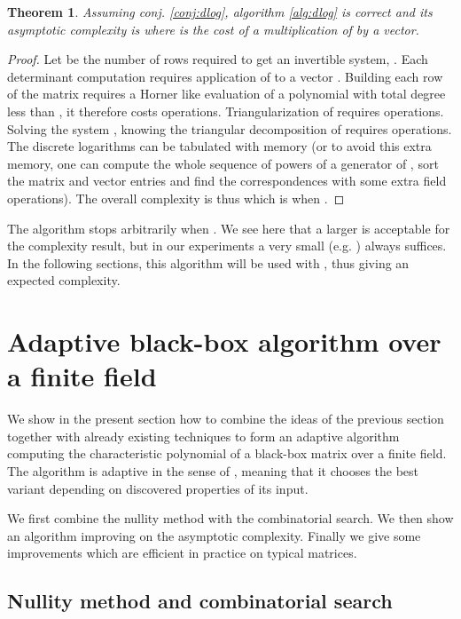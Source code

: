 \documentclass{article}
\newtheorem{thm}{Theorem}[section]
\begin{document}
\begin{thm}Assuming conj. \ref{conj:dlog},
algorithm \ref{alg:dlog} is correct and its asymptotic complexity is 
 where  is the cost of a multiplication of
 by a vector.
\end{thm}
\begin{proof} Let  be the
  number of rows required to get an invertible system, .
Each determinant computation requires  application of  to a vector
\cite[\S 3.1]{Turner:2002:these}. Building each row of the matrix requires a
Horner like evaluation of a polynomial with total degree less than ,
it therefore costs  operations. Triangularization of 
requires  operations. Solving the system , knowing
the triangular decomposition of  requires 
operations. The discrete logarithms can be tabulated
\cite{jgd:2004:dotprod} with  memory
(or to avoid this extra memory, one can compute the whole
sequence of powers of a generator of , sort the matrix and vector
entries and find the correspondences with some 
extra field operations). 
The overall complexity is thus 
 which is  
when . \end{proof}
The algorithm stops arbitrarily when .  We see here that a larger 
is acceptable for the complexity result, but in our experiments a very small 
(e.g. ) always suffices. 
In the following sections, this algorithm will be used with
, thus giving an expected  complexity.


\section{Adaptive black-box algorithm over a finite field}\label{sec:adap}

We show in the present section how to combine the ideas of the
previous section together with already existing techniques to form an adaptive
algorithm computing the characteristic polynomial of a black-box matrix
over a finite field. The algorithm is adaptive in the sense of
\cite{jgd:2006:AHA}, meaning that it chooses the best variant depending
on discovered properties of its input.

We first combine the nullity method with the combinatorial search.
We then show  an algorithm improving on the asymptotic
complexity. Finally we give some improvements which are efficient in practice 
on typical matrices.

\subsection{Nullity method and combinatorial search}
\end{document}
